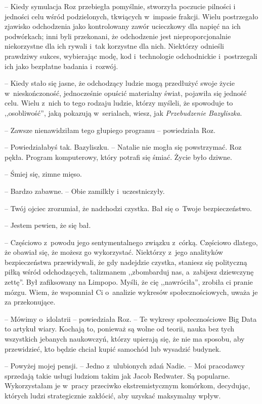 \documentclass[oneside,polish,11pt,sfheadings]{mwbk}
\begin{document}
-- Kiedy symulacja Roz przebiegła pomyślnie, stworzyła poczucie pilności
i jedności celu wśród podzielonych, tkwiących w~impasie frakcji. Wielu
postrzegało zjawisko odchodzenia jako kontrolowany zawór ucieczkowy dla
napięć na ich podwórkach; inni byli przekonani, że odchodzenie jest
nieproporcjonalnie niekorzystne dla ich rywali i~tak korzystne dla nich.
Niektórzy odnieśli prawdziwy sukces, wybierając modę, kod i~technologie
odchodnickie i~postrzegali ich jako bezpłatne badania i~rozwój.

-- Kiedy stało się jasne, że odchodzący ludzie mogą przedłużyć swoje
życie w~nieskończoność, jednocześnie opuścić materialny świat, pojawiła
się jedność celu. Wielu z~nich to tego rodzaju ludzie, którzy myśleli,
że spowoduje to ,,osobliwość'', jaką pokazują w~serialach, wiesz, jak
\textit{Przebudzenie Bazyliszka}.

-- Zawsze nienawidziłam tego głupiego programu -- powiedziała Roz.

-- Powiedziałabyś tak. Bazyliszku. -- Natalie nie mogła się powstrzymać.
Roz pękła. Program komputerowy, który potrafi się śmiać. Życie było
dziwne.

-- Śmiej się, zimne mięso.

-- Bardzo zabawne. -- Obie zamilkły i~uczestniczyły.

-- Twój ojciec zrozumiał, że nadchodzi czystka. Bał się o~Twoje
bezpieczeństwo.

-- Jestem pewien, że się bał.

-- Częściowo z~powodu jego sentymentalnego związku z~córką. Częściowo
dlatego, że obawiał się, że możesz go wykorzystać. Niektórzy z~jego
analityków bezpieczeństwa przewidywali, że gdy nadejdzie czystka,
staniesz się polityczną piłką wśród odchodzących, talizmanem
,,zbombarduj nas, a~zabijesz dziewczynę zettę''. Był zafiksowany na
Limpopo. Myśli, że cię ,,nawróciła'', zrobiła ci pranie mózgu. Wiem, że
wspomniał Ci o~analizie wykresów społecznościowych, uważa je za
przekonujące.

-- Mówimy o~idolatrii -- powiedziała Roz. -- Te wykresy społecznościowe Big
Data to artykuł wiary. Kochają to, ponieważ są wolne od teorii, nauka
bez tych wszystkich jebanych naukowczyń, którzy upierają się, że nie ma
sposobu, aby przewidzieć, kto będzie chciał kupić samochód lub wysadzić
budynek.

-- Powyżej mojej pensji. -- Jedno z~ulubionych zdań Nadie. -- Moi
pracodawcy sprzedają takie usługi ludziom takim jak Jacob Redwater. Są
popularne. Wykorzystałam je w~pracy przeciwko ekstremistycznym komórkom,
decydując, których ludzi strategicznie zakłócić, aby uzyskać maksymalny
wpływ.
\end{document}

